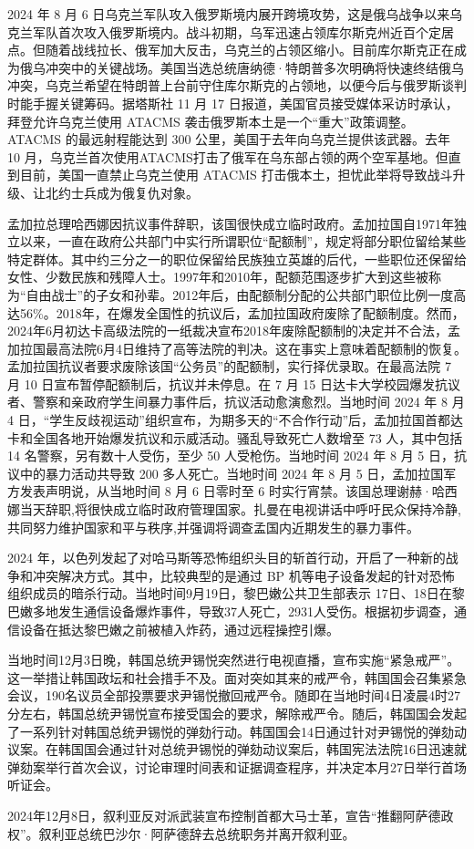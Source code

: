 2024 年 8 月 6 日乌克兰军队攻入俄罗斯境内展开跨境攻势，这是俄乌战争以来乌克兰军队首次攻入俄罗斯境内。战斗初期，乌军迅速占领库尔斯克州近百个定居点。但随着战线拉长、俄军加大反击，乌克兰的占领区缩小。目前库尔斯克正在成为俄乌冲突中的关键战场。美国当选总统唐纳德·特朗普多次明确将快速终结俄乌冲突，乌克兰希望在特朗普上台前守住库尔斯克的占领地，以便今后与俄罗斯谈判时能手握关键筹码。据塔斯社 11 月 17 日报道，美国官员接受媒体采访时承认，拜登允许乌克兰使用 ATACMS 袭击俄罗斯本土是一个“重大”政策调整。ATACMS 的最远射程能达到 300 公里，美国于去年向乌克兰提供该武器。去年 10 月，乌克兰首次使用ATACMS打击了俄军在乌东部占领的两个空军基地。但直到目前，美国一直禁止乌克兰使用 ATACMS 打击俄本土，担忧此举将导致战斗升级、让北约士兵成为俄复仇对象。

孟加拉总理哈西娜因抗议事件辞职，该国很快成立临时政府。孟加拉国自1971年独立以来，一直在政府公共部门中实行所谓职位“配额制”，规定将部分职位留给某些特定群体。其中约三分之一的职位保留给民族独立英雄的后代，一些职位还保留给女性、少数民族和残障人士。1997年和2010年，配额范围逐步扩大到这些被称为“自由战士”的子女和孙辈。2012年后，由配额制分配的公共部门职位比例一度高达56\%。2018年，在爆发全国性的抗议后，孟加拉国政府废除了配额制度。然而，2024年6月初达卡高级法院的一纸裁决宣布2018年废除配额制的决定并不合法，孟加拉国最高法院6月4日维持了高等法院的判决。这在事实上意味着配额制的恢复。孟加拉国抗议者要求废除该国“公务员”的配额制，实行择优录取。在最高法院 7 月 10 日宣布暂停配额制后，抗议并未停息。在 7 月 15 日达卡大学校园爆发抗议者、警察和亲政府学生间暴力事件后，抗议活动愈演愈烈。当地时间 2024 年 8 月 4 日，“学生反歧视运动”组织宣布，为期多天的“不合作行动”后，孟加拉国首都达卡和全国各地开始爆发抗议和示威活动。骚乱导致死亡人数增至 73 人，其中包括 14 名警察，另有数十人受伤，至少 50 人受枪伤。当地时间 2024 年 8 月 5 日，抗议中的暴力活动共导致 200 多人死亡。当地时间 2024 年 8 月 5 日，孟加拉国军方发表声明说，从当地时间 8 月 6 日零时至 6 时实行宵禁。该国总理谢赫·哈西娜当天辞职,将很快成立临时政府管理国家。扎曼在电视讲话中呼吁民众保持冷静,共同努力维护国家和平与秩序,并强调将调查孟国内近期发生的暴力事件。

2024 年，以色列发起了对哈马斯等恐怖组织头目的斩首行动，开启了一种新的战争和冲突解决方式。其中，比较典型的是通过 BP 机等电子设备发起的针对恐怖组织成员的暗杀行动。当地时间9月19日，黎巴嫩公共卫生部表示 17日、18日在黎巴嫩多地发生通信设备爆炸事件，导致37人死亡，2931人受伤。根据初步调查，通信设备在抵达黎巴嫩之前被植入炸药，通过远程操控引爆。

当地时间12月3日晚，韩国总统尹锡悦突然进行电视直播，宣布实施“紧急戒严”。这一举措让韩国政坛和社会措手不及。面对突如其来的戒严令，韩国国会召集紧急会议，190名议员全部投票要求尹锡悦撤回戒严令。随即在当地时间4日凌晨4时27分左右，韩国总统尹锡悦宣布接受国会的要求，解除戒严令。随后，韩国国会发起了一系列针对韩国总统尹锡悦的弹劾行动。韩国国会14日通过针对尹锡悦的弹劾动议案。在韩国国会通过针对总统尹锡悦的弹劾动议案后，韩国宪法法院16日迅速就弹劾案举行首次会议，讨论审理时间表和证据调查程序，并决定本月27日举行首场听证会。

2024年12月8日，叙利亚反对派武装宣布控制首都大马士革，宣告“推翻阿萨德政权”。叙利亚总统巴沙尔·阿萨德辞去总统职务并离开叙利亚。